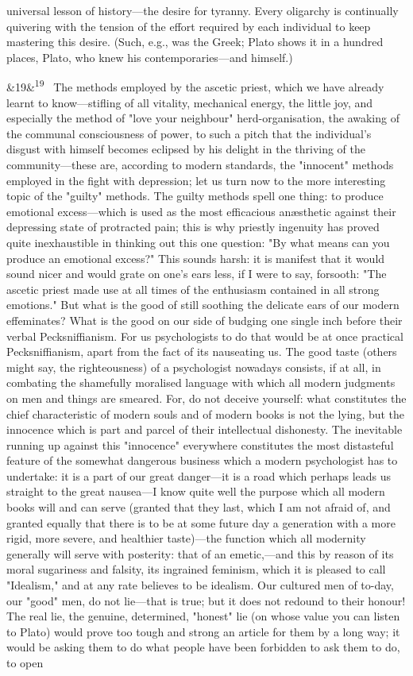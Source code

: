 \documentclass[12pt]{article}
\newcommand{\para}[1][]{\par\noindent\ifx&#1&\else\textsuperscript{\footnotesize #1}~\fi}
\begin{document}
universal lesson of history---the desire for tyranny. Every oligarchy is continually quivering with the tension of the effort required by each individual to keep mastering this desire. (Such, e.g., was the Greek; Plato shows it in a hundred places, Plato, who knew his contemporaries---and himself.)

\para[19] The methods employed by the ascetic priest, which we have already learnt to know---stifling of all vitality, mechanical energy, the little joy, and especially the method of "love your neighbour" herd-organisation, the awaking of the communal consciousness of power, to such a pitch that the individual's disgust with himself becomes eclipsed by his delight in the thriving of the community---these are, according to modern standards, the "innocent" methods employed in the fight with depression; let us turn now to the more interesting topic of the "guilty" methods. The guilty methods spell one thing: to produce emotional excess---which is used as the most efficacious anæsthetic against their depressing state of protracted pain; this is why priestly ingenuity has proved quite inexhaustible in thinking out this one question: "By what means can you produce an emotional excess?" This sounds harsh: it is manifest that it would sound nicer and would grate on one's ears less, if I were to say, forsooth: "The ascetic priest made use at all times of the enthusiasm contained in all strong emotions." But what is the good of still soothing the delicate ears of our modern effeminates? What is the good on our side of budging one single inch before their verbal Pecksniffianism. For us psychologists to do that would be at once practical Pecksniffianism, apart from the fact of its nauseating us. The good taste (others might say, the righteousness) of a psychologist nowadays consists, if at all, in combating the shamefully moralised language with which all modern judgments on men and things are smeared. For, do not deceive yourself: what constitutes the chief characteristic of modern souls and of modern books is not the lying, but the innocence which is part and parcel of their intellectual dishonesty. The inevitable running up against this "innocence" everywhere constitutes the most distasteful feature of the somewhat dangerous business which a modern psychologist has to undertake: it is a part of our great danger---it is a road which perhaps leads us straight to the great nausea---I know quite well the purpose which all modern books will and can serve (granted that they last, which I am not afraid of, and granted equally that there is to be at some future day a generation with a more rigid, more severe, and healthier taste)---the function which all modernity generally will serve with posterity: that of an emetic,---and this by reason of its moral sugariness and falsity, its ingrained feminism, which it is pleased to call "Idealism," and at any rate believes to be idealism. Our cultured men of to-day, our "good" men, do not lie---that is true; but it does not redound to their honour! The real lie, the genuine, determined, "honest" lie (on whose value you can listen to Plato) would prove too tough and strong an article for them by a long way; it would be asking them to do what people have been forbidden to ask them to do, to open 
\end{document}
